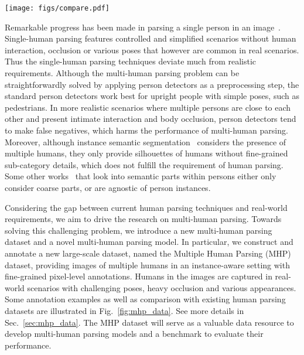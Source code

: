 \documentclass[10pt, letterpaper]{article}
\begin{document}
\begin{figure*}[t]
  \centering
  \texttt{[image: figs/compare.pdf]}
  \caption{Annotation examples for our constructed Multiple Human Parsing (MHP) dataset (c) and other existing datasets for human parsing (a: ATR~\cite{liang2015deep}; b: Look into Person (LIP)~\cite{gong2017look}). In (c), rectangles in different colors indicate distinct person instances. ATR contains images of single persons with upright position; LIP includes more pose variations, but still only contains a single person in each image. The MHP dataset provides images with fine-grained annotations for multiple persons with interaction, occlusion and various poses, aligning better with real-world scenarios.} \label{fig:mhp_data}
\end{figure*}

Remarkable progress has been made in parsing a single person in an image~\cite{yamaguchi2012parsing,dong2013deformable,liang2015human}. 
Single-human parsing features controlled and simplified scenarios without human interaction, occlusion or various poses that however are common in real scenarios. Thus the single-human parsing techniques deviate much from realistic requirements. Although the multi-human parsing problem can be straightforwardly solved by applying person detectors as a preprocessing step, the standard person detectors work best for upright people with simple poses, such as pedestrians. In more realistic scenarios where multiple persons are close to each other and present intimate interaction and body occlusion, person detectors tend to make false negatives, which harms the performance of multi-human parsing. Moreover, although instance semantic segmentation~\cite{liang2015proposal,dai2016instance} considers the presence of multiple humans, they only provide silhouettes of humans without fine-grained sub-category details, which does not fulfill the requirement of human parsing. Some other works~\cite{chen2014detect,chen2016deeplab,gong2017look,li2017holistic,jiang2017detangling} that look into semantic parts within persons either only consider coarse parts, or are agnostic of person instances.  

Considering the gap between current human parsing techniques and real-world requirements, we aim to drive the research on multi-human parsing.  Towards solving this challenging  problem, we introduce a new multi-human parsing dataset and a novel multi-human parsing model. In particular, we construct and annotate a new large-scale dataset,  named the Multiple Human Parsing (MHP) dataset, providing images of multiple humans in an instance-aware setting with fine-grained pixel-level  annotations. Humans in the images are captured in real-world scenarios with challenging poses, heavy occlusion and various appearances. Some annotation examples as well as comparison with existing human parsing datasets are illustrated in Fig.~\ref{fig:mhp_data}. See more details in Sec.~\ref{sec:mhp_data}.  The MHP dataset will serve as a valuable data resource to develop multi-human parsing models and a benchmark to evaluate their performance.
\end{document}
